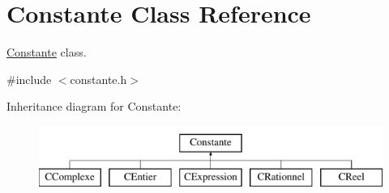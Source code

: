 \hypertarget{class_constante}{\section{Constante Class Reference}
\label{class_constante}
}


\hyperlink{class_constante}{Constante} class.  




{\ttfamily \#include $<$constante.\-h$>$}

Inheritance diagram for Constante\-:\begin{figure}[H]
\begin{center}
\leavevmode
\includegraphics[height=2.000000cm]{class_constante}
\end{center}
\end{figure}
